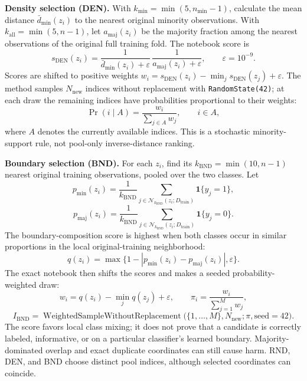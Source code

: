 \textbf{Density selection (DEN).} With \(k_{\min}=\min(5,n_{\min}-1)\), calculate the mean distance \(\bar d_{\min}(z_i)\) to the nearest original minority observations. With \(k_{\mathrm{all}}=\min(5,n-1)\), let \(a_{\mathrm{maj}}(z_i)\) be the majority fraction among the nearest observations of the original full training fold. The notebook score is
\begin{equation}\label{eq:7}
s_{\mathrm{DEN}}(z_i)=
\frac{1}{\bar d_{\min}(z_i)+\varepsilon}\,
\frac{1}{a_{\mathrm{maj}}(z_i)+\varepsilon},
\qquad \varepsilon=10^{-9}.
\end{equation}
Scores are shifted to positive weights \(w_i=s_{\mathrm{DEN}}(z_i)-\min_j s_{\mathrm{DEN}}(z_j)+\varepsilon\). The method samples \(N_{\mathrm{new}}\) indices without replacement with \texttt{RandomState(42)}; at each draw the remaining indices have probabilities proportional to their weights:
\begin{equation}\label{eq:8}
\Pr(i\mid A)=\frac{w_i}{\sum_{j\in A}w_j},
\qquad i\in A,
\end{equation}
where \(A\) denotes the currently available indices. This is a stochastic minority-support rule, not pool-only inverse-distance ranking.

\textbf{Boundary selection (BND).} For each \(z_i\), find its \(k_{\mathrm{BND}}=\min(10,n-1)\) nearest original training observations, pooled over the two classes. Let
\begin{equation}\label{eq:9}
p_{\min}(z_i)=\frac{1}{k_{\mathrm{BND}}}
\sum_{j\in\mathcal{N}_{k_{\mathrm{BND}}}(z_i;D_{\mathrm{train}})}
\mathbf{1}\{y_j=1\},
\end{equation}
\begin{equation}\label{eq:10}
p_{\mathrm{maj}}(z_i)=\frac{1}{k_{\mathrm{BND}}}
\sum_{j\in\mathcal{N}_{k_{\mathrm{BND}}}(z_i;D_{\mathrm{train}})}
\mathbf{1}\{y_j=0\}.
\end{equation}
The boundary-composition score is highest when both classes occur in similar proportions in the local original-training neighborhood:
\begin{equation}\label{eq:11}
q(z_i)=\max\{1-|p_{\min}(z_i)-p_{\mathrm{maj}}(z_i)|,\varepsilon\}.
\end{equation}
The exact notebook then shifts the scores and makes a seeded probability-weighted draw:
\begin{equation}\label{eq:12}
w_i=q(z_i)-\min_j q(z_j)+\varepsilon,\qquad
\pi_i=\frac{w_i}{\sum_{j=1}^{M}w_j},
\end{equation}
\begin{equation}\label{eq:13}
I_{\mathrm{BND}}=
\operatorname{WeightedSampleWithoutReplacement}
\bigl(\{1,\ldots,M\},N_{\mathrm{new}};\pi,\mathrm{seed}=42\bigr).
\end{equation}
The score favors local class mixing; it does not prove that a candidate is correctly labeled, informative, or on a particular classifier's learned boundary. Majority-dominated overlap and exact duplicate coordinates can still cause harm. RND, DEN, and BND choose distinct pool indices, although selected coordinates can coincide.

